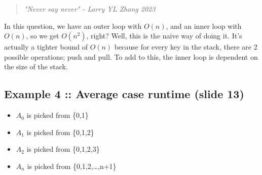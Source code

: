 \documentclass[12pt]{article}
\begin{document}
\begin{quote}
    \textit{"Never say never" - Larry YL Zhang 2023}
\end{quote}
In this question, we have an outer loop with $O(n)$, and an inner loop with $O(n)$, so we get $O(n^2)$, right? Well, this is the naive way of doing it. It's actually a tighter bound of $O(n)$ because for every key in the stack, there are 2 possible operations; push and pull. To add to this, the inner loop is dependent on the size of the stack.

\subsection*{Example 4 :: Average case runtime (slide 13)}

\begin{itemize}
    \item $A_0$ is picked from \{0,1\}
    \item $A_1$ is picked from \{0,1,2\}
    \item $A_2$ is picked from \{0,1,2,3\}
    \item $A_n$ is picked from \{0,1,2,\ldots,n+1\}
\end{itemize}
\end{document}
